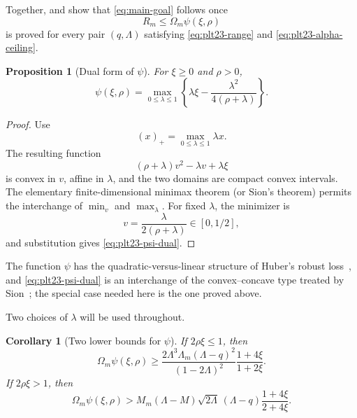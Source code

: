 \documentclass[11pt]{article}
\newtheorem{proposition}[theorem]{Proposition}
\newtheorem{corollary}[theorem]{Corollary}
\numberwithin{equation}{section}
\newcommand{\pos}[1]{\left(#1\right)_{+}}
\begin{document}
Together,  and  show that \eqref{eq:main-goal} follows once
\begin{equation}\label{eq:plt23-scalar-target}
  R_m\le \Omega_m\psi(\xi,\rho)
\end{equation}
is proved for every pair $(q,\Lambda)$ satisfying \eqref{eq:plt23-range} and \eqref{eq:plt23-alpha-ceiling}.

\begin{proposition}[Dual form of $\psi$]\label{prop:plt23-huber-dual}
  For $\xi\ge0$ and $\rho>0$,
  \begin{equation}\label{eq:plt23-psi-dual}
    \psi(\xi,\rho)=
    \max_{0\le\lambda\le1}
    \left\{
    \lambda\xi-\frac{\lambda^2}{4(\rho+\lambda)}
    \right\}.
  \end{equation}
\end{proposition}

\begin{proof}
  Use
  \[
    \pos x=\max_{0\le\lambda\le1}\lambda x.
  \]
  The resulting function
  \[
    (\rho+\lambda)v^2-\lambda v+\lambda\xi
  \]
  is convex in $v$, affine in $\lambda$, and the two domains are compact convex intervals.
  The elementary finite-dimensional minimax theorem (or Sion's theorem) permits the interchange of $\min_v$ and $\max_\lambda$.
  For fixed $\lambda$, the minimizer is
  \[
    v=\frac{\lambda}{2(\rho+\lambda)}\in[0,1/2],
  \]
  and substitution gives \eqref{eq:plt23-psi-dual}.
\end{proof}

The function $\psi$ has the quadratic-versus-linear structure of Huber's robust loss~\cite{Huber1964}, and \eqref{eq:plt23-psi-dual} is an interchange of the convex--concave type treated by Sion~\cite{Sion1958}; the special case needed here is the one proved above.

Two choices of $\lambda$ will be used throughout.

\begin{corollary}[Two lower bounds for $\psi$]\label{cor:plt23-two-witnesses}
  If $2\rho\xi\le1$, then
  \begin{equation}\label{eq:plt23-witness-quadratic}
    \Omega_m\psi(\xi,\rho)
    \ge
    \frac{2\Lambda^3\Lambda_m(\Lambda-q)^2}{(1-2\Lambda)^2}
    \frac{1+4\xi}{1+2\xi}.
  \end{equation}
  If $2\rho\xi>1$, then
  \begin{equation}\label{eq:plt23-witness-linear}
    \Omega_m\psi(\xi,\rho)
    >M_m(\Lambda-M)\sqrt{2\Lambda}\,(\Lambda-q)
    \frac{1+4\xi}{2+4\xi}.
  \end{equation}
\end{corollary}
\end{document}

